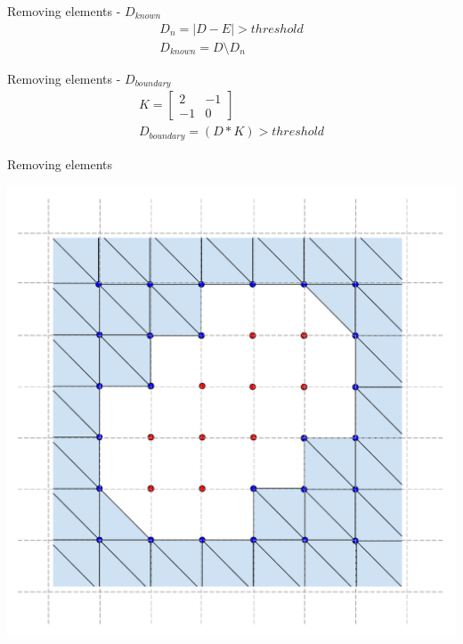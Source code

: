 \begin{frame}{Removing elements - $D_{known}$} %
  \begin{gather*}
    D_n = \lvert D - E \rvert > threshold \\
    D_{known} = D \setminus D_n
  \end{gather*}
\end{frame}


\begin{frame}{Removing elements - $D_{boundary}$} %
  \begin{gather*}
    K = \begin{bmatrix} 2 & -1 \\ -1 & 0 \end{bmatrix} \\
    D_{boundary} = (D \ast K) > threshold
  \end{gather*}
\end{frame}

\note[itemize]{
\item
}

\begin{frame}{Removing elements} %
  \begin{center}
  \includegraphics[height=0.90\textheight]{../figures/approach_sr_element_removal.pdf}
  \end{center}
\end{frame}

